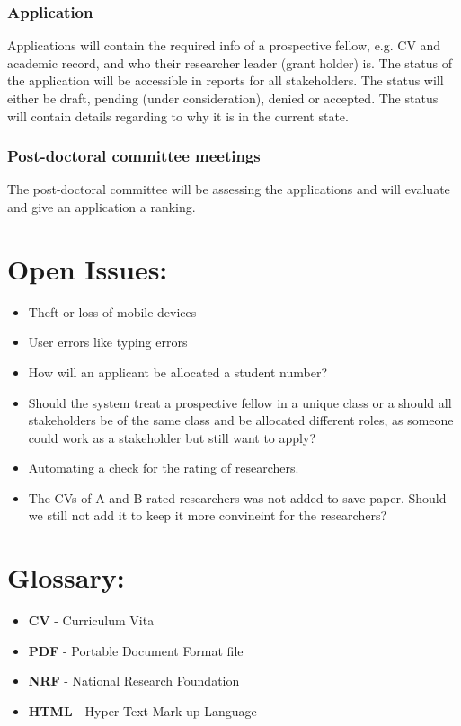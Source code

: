 \documentclass[12pt]{article}
\begin{document}
\subsubsection{Application}
Applications will contain the required info of a prospective fellow, e.g. CV and academic record, and who their researcher leader (grant holder) is. The status of the application will be accessible in reports for all stakeholders. The status will either be draft, pending (under consideration), denied or accepted. The status will contain details regarding to why it is in the current state.
\subsubsection{Post-doctoral committee meetings}
The post-doctoral committee will be assessing the applications and will evaluate and give an application a ranking.

\newpage	
\section{Open Issues:} %
\vspace{0.2in}

\begin{itemize}
\item Theft or loss of mobile devices
\item User errors like typing errors
\item How will an applicant be allocated a student number?
\item Should the system treat a prospective fellow in a unique class or a should all stakeholders be of the same class and be allocated different roles, as someone could work as a stakeholder but still want to apply?
\item Automating a check for the rating of researchers.
\item The CVs of A and B rated researchers was not added to save paper. Should we still not add it to keep it more convineint for the researchers?
\end{itemize}


\vspace{0.5in}

\newpage
\section{Glossary:} %
\vspace{0.2in}

\begin{itemize}


\item \textbf{CV} - Curriculum Vita
\item \textbf{PDF} - Portable Document Format file
\item \textbf{NRF} - National Research Foundation
\item \textbf{HTML} - Hyper Text Mark-up Language

\end{itemize}	


\vspace{0.5in}
\end{document}
